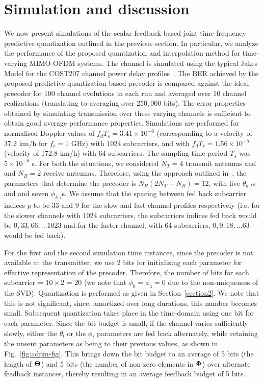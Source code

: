\documentclass[journal,10pt,twocolumn]{IEEEtran}
\begin{document}
\section{Simulation and discussion}
\label{section3}
We now present simulations of the scalar feedback based joint
time-frequency predictive quantization outlined in the previous
section. In particular, we analyze the performance of the proposed
quantization and interpolation method for time-varying MIMO-OFDM
systems. The channel is simulated using the typical Jakes Model 
for the COST207 channel power delay
profiles~\cite{molisch2006cost259,cost1989cost}. The BER achieved by
the proposed predictive quantization based precoder is compared
against the ideal precoder for 100 channel evolutions in each run and
averaged over 10 channel realizations (translating to averaging over $250,000$ bits). The error properties obtained by simulating transmission over these varying channels is sufficient to obtain good average performance properties. Simulations are performed for
normalised Doppler values of $f_dT_s = 3.41\times 10^{-6}$ (corresponding
to a velocity of 37.2 km/h for $f_c = 1$ GHz) with 1024 subcarriers, and with
$f_dT_s = 1.56 \times 10^{-5}$ (velocity of 172.8 km/h) with 64
subcarriers. The sampling time period $T_s$ was $5\times10^{-8}$
s. For both the situations, we considered $N_T=4$ transmit antennas
and and $N_R=2$ receive antennas. Therefore, using the approach
outlined in~\cite{4114278}, the parameters that determine the precoder is
$N_{R}(2N_{T} - N_R) = 12$, with five $\theta_{k,l}$s and and seven
$\phi_{k,l}$s. We assume that the spacing between fed back subcarrier
indices $p$ to be $33$ and $9$ for the slow and fast channel profiles
respectively (i.e. for the slower channels with 1024 subcarriers, the
subcarriers indices fed back would be $0, 33, 66, \ldots 1023$ and for
the faster channel, with 64 subcarriers, $0, 9, 18, \ldots 63$ would
be fed back).

For the first and the second simulation time instances, since the
precoder is not available at the transmitter, we use 2 bits for
initializing each parameter for effective representation of the
precoder. Therefore, the number of bits for each subcarrier =
$10\times 2$ = 20 (we note that $\phi_0 = \phi_4 = 0$ due to the
non-uniqueness of the SVD). Quantization is performed as given in
Section~\ref{section2}. We note that this is not significant, since,
amortized over long durations, this number becomes small. Subsequent
quantization takes place in the time-domain using one bit for each
parameter. Since the bit budget is small, if the channel varies
sufficiently slowly, either the $\theta_l$ or the $\phi_i$ parameters
are fed back alternately, while retaining the unsent parameters as
being to their previous values, as shown in
Fig.~\ref{fig:adpm-fig}.
This brings down the bit budget to an average of 5 bits (the length of
$\bf{\Theta}$) and 5 bits (the number of non-zero elements in
$\bf{\Phi}$) over alternate feedback instances, thereby resulting in
an average feedback budget of 5 bits.
\end{document}
